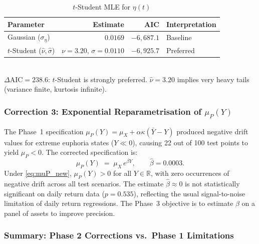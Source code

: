 \documentclass[12pt,a4paper]{article}
\theoremstyle{definition}
\theoremstyle{remark}
\newcommand{\R}{\mathbb{R}}
\begin{document}
\begin{table}[H]
  \centering
  \caption{$t$-Student MLE for $\eta(t)$}
  \label{tab:tstudent}
  \begin{tabular}{lrrl}
    \toprule
    Parameter & Estimate & AIC & Interpretation \\
    \midrule
    Gaussian ($\sigma_\eta$) & $0.0169$ & $-6{,}687.1$ & Baseline \\
    $t$-Student ($\hat{\nu}, \hat{\sigma}$) & $\nu = 3.20$, $\sigma = 0.0110$
      & $-6{,}925.7$ & Preferred \\
    \bottomrule
  \end{tabular}
  \smallskip\\
  \small $\Delta\mathrm{AIC} = 238.6$: $t$-Student is strongly preferred.
  $\hat{\nu} = 3.20$ implies very heavy tails (variance finite, kurtosis infinite).
\end{table}

\subsubsection{Correction 3: Exponential Reparametrisation of $\mu_P(Y)$}

The Phase~1 specification $\mu_P(Y) = \mu_X + \alpha\kappa(\bar{Y}-Y)$
produced negative drift values for extreme euphoria states ($Y \ll 0$),
causing 22 out of 100 test points to yield $\mu_P < 0$. The corrected
specification is:
\begin{equation}
  \mu_P(Y) \;=\; \mu_X\,e^{\beta Y}, \qquad \hat{\beta} = 0.0003.
  \label{eq:muP_new}
\end{equation}
Under \eqref{eq:muP_new}, $\mu_P(Y) > 0$ for all $Y \in \R$, with
zero occurrences of negative drift across all test scenarios.
The estimate $\hat{\beta} \approx 0$ is not statistically significant
on daily return data ($p = 0.535$), reflecting the usual signal-to-noise
limitation of daily return regressions. The Phase~3 objective is to
estimate $\beta$ on a panel of assets to improve precision.

\subsubsection{Summary: Phase 2 Corrections vs.\ Phase 1 Limitations}
\end{document}

